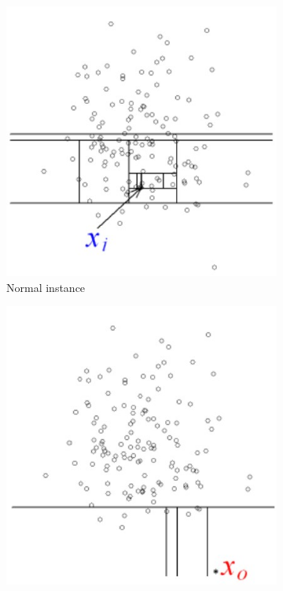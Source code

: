 \begin{figure}
    \begin{subfigure}[t]{0.23\textwidth}
        \includegraphics[width=1\textwidth]{images/IF_isolate_normal_inst.jpg}
        \caption{Normal instance}   
        \label{fig:IF_isolate_normal_inst}
    \end{subfigure}
    \begin{subfigure}[t]{0.23\textwidth}
        \includegraphics[width=1\textwidth]{images/IF_isolate_abnormal_inst.jpg}

\end{subfigure}
\end{figure}
